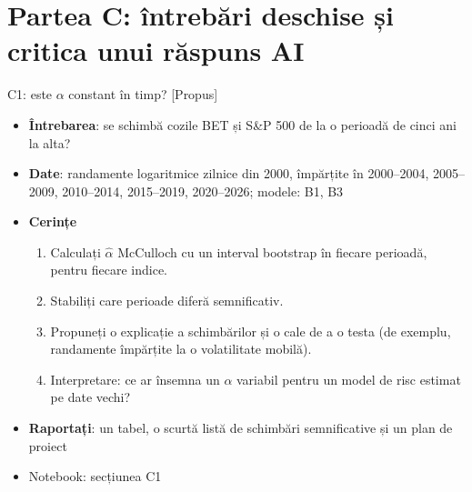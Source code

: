 \section{Partea C: întrebări deschise și critica unui răspuns AI}

\begin{frame}{C1: este $\alpha$ constant în timp? [Propus]}
\itemsize{\footnotesize}
\begin{itemize}
\item \textbf{Întrebarea}: se schimbă cozile BET și S\&P 500 de la o perioadă de cinci ani la alta?
\item \textbf{Date}: randamente logaritmice zilnice din 2000, împărțite în 2000--2004, 2005--2009, 2010--2014, 2015--2019, 2020--2026; modele: B1, B3
\item \textbf{Cerințe}
\begin{enumerate}
    \item Calculați $\hat\alpha$ McCulloch cu un interval bootstrap în fiecare perioadă, pentru fiecare indice.
    \item Stabiliți care perioade diferă semnificativ.
    \item Propuneți o explicație a schimbărilor și o cale de a o testa (de exemplu, randamente împărțite la o volatilitate mobilă).
    \item Interpretare: ce ar însemna un $\alpha$ variabil pentru un model de risc estimat pe date vechi?
\end{enumerate}
\item \textbf{Raportați}: un tabel, o scurtă listă de schimbări semnificative și un plan de proiect
\item Notebook: secțiunea C1
\end{itemize}
\end{frame}


